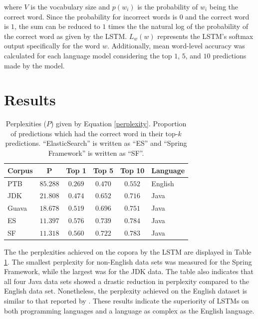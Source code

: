 \documentclass[runningheads,a4paper]{llncs}
\newcommand{\tabhorzspacing}{0.5em}
\newcommand{\tabvertspacing}{1.1}
\begin{document}
where $V$ is the vocabulary size and $p(w_i)$ is the probability of
$w_i$ being the correct word. Since the probability for incorrect
words is $0$ and the correct word is $1$, the sum can be reduced to
$1$ times the the natural log of the probability of the correct word
as given by the LSTM.
$L_w(w)$ represents the LSTM's softmax output specifically for the
word $w$. Additionally, mean word-level accuracy was calculated for
each language model considering the top $1$, $5$, and $10$ predictions
made by the model.

\section{Results}


\begin{table}[t]
    \caption{Perplexities ($P$) given by Equation \ref{perplexity}.
    Proportion of predictions which had the correct
    word in their top-$k$ predictions.
    ``ElasticSearch'' is written as ``ES'' and ``Spring
    Framework'' is written as ``SF''.}
    \label{topk-table}
    \vskip 0.15in
    \begin{center}
    \setlength{\tabcolsep}{\tabhorzspacing}
    {\renewcommand{\arraystretch}{\tabvertspacing}
    \begin{tabular}{lccccl}
    \hline
    Corpus & P & Top 1 & Top 5 & Top 10 & Language \\
    \hline
    PTB   & $85.288$ & $0.269$ & $0.470$ & $0.552$ & English \\
    JDK   & $21.808$ & $0.474$ & $0.652$ & $0.716$ & Java \\
    Guava & $18.678$ & $0.519$ & $0.696$ & $0.751$ & Java \\
    ES    & $11.397$ & $0.576$ & $0.739$ & $0.784$ & Java \\
    SF    & $11.318$ & $0.560$ & $0.722$ & $0.783$ & Java \\
    \hline
    \end{tabular}}
    \end{center}
    \vskip -0.1in
\end{table}

The the perplexities achieved on the copora by the LSTM are displayed in
Table \ref{topk-table}. The smallest perplexity for non-English data sets 
was measured for the Spring Framework, while the largest was for the JDK data. 
The table also indicates that all four Java data sets showed a drastic 
reduction in perplexity compared to the English data set. Nonetheless, the 
perplexity achieved on the English dataset is similar to that reported by 
\citet{LSTMArticle}. These results indicate the superiority of LSTMs on both
programming languages and a language as complex as the English language.
\end{document}
